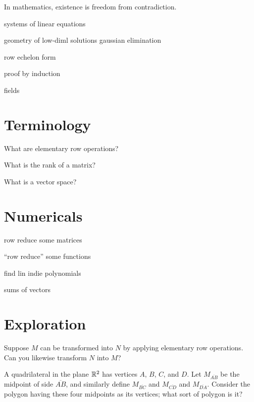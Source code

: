 \documentclass{homework}
\author{Jim Fowler}
\begin{document}
\maketitle

\begin{inspiration}
In mathematics, existence is freedom from contradiction.
\end{inspiration}

systems of linear equations

geometry of low-diml solutions
gaussian elimination

row echelon form

proof by induction

fields

\section{Terminology}

\begin{problem}
  What are elementary row operations?
\end{problem}

\begin{problem}
  What is the rank of a matrix?
\end{problem}

\begin{problem}
  What is a vector space?
\end{problem}

\section{Numericals}

row reduce some matrices

``row reduce'' some functions

find lin indie polynomials

sums of vectors

\section{Exploration}

\begin{problem}
  Suppose $M$ can be transformed into $N$ by applying elementary row
  operations.  Can you likewise transform $N$ into $M$?
\end{problem}

\begin{problem}
  A quadrilateral in the plane $\mathbb{R}^2$ has vertices $A$, $B$, $C$, and
  $D$.  Let $M_{\overline{AB}}$ be the midpoint of side
  $\overline{AB}$, and similarly define $M_{\overline{BC}}$ and
    $M_{\overline{CD}}$ and $M_{\overline{DA}}$.  Consider the polygon
        having these four midpoints as its vertices; what sort of
        polygon is it?
\end{problem}
\end{document}
